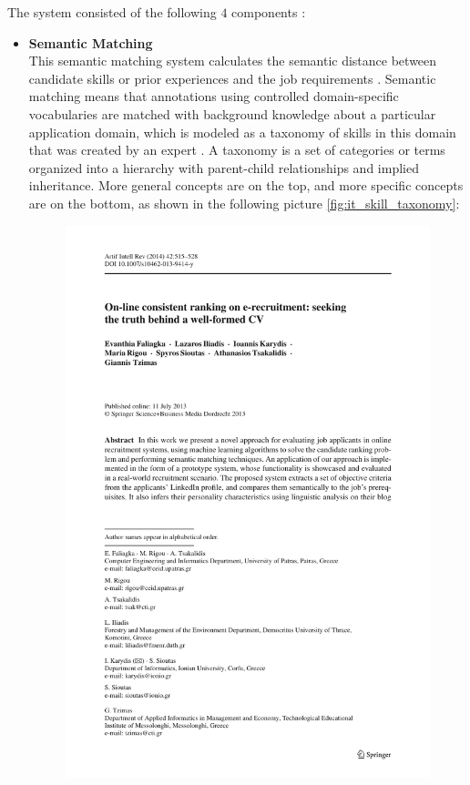 \documentclass[draft,final]{thesisclass} %
\begin{document}
The system consisted of the following $4$ components \parencite[518-519]{applicant_semantic_matching}:
\begin{itemize}
    \item \textbf{Semantic Matching}\\
    This semantic matching system calculates the semantic distance between candidate skills or prior experiences and the job requirements \parencite[518]{applicant_semantic_matching}.
    Semantic matching means that annotations using controlled domain-specific vocabularies are matched with background knowledge about a particular application domain, which is modeled as a taxonomy of skills in this domain that was created by an expert \parencite[519]{applicant_semantic_matching}.
    A taxonomy is a set of categories or terms organized into a hierarchy with parent-child relationships and implied inheritance. More general concepts are on the top, and more specific concepts are on the bottom, as shown in the following picture \ref{fig:it_skill_taxonomy}:
    \begin{figure}[H]
        \centering
        \includegraphics[scale=1,page=5,width=0.8\linewidth,trim={45 510 45 55},clip]{literature/applicant_semantic_matching.pdf}

\end{figure}
\end{itemize}
\end{document}

